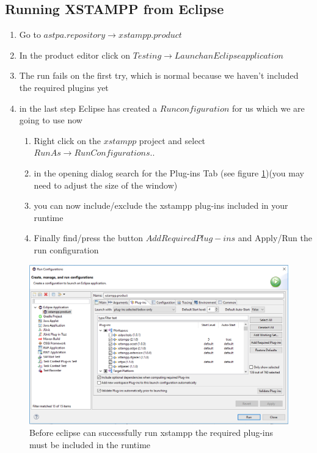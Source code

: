 \subsection{Running XSTAMPP from Eclipse}
\begin{enumerate}
\item Go to $astpa.repository\rightarrow xstampp.product$
\item In the product editor click on $ Testing\rightarrow Launch an Eclipse application$
\item The run fails on the first try, which is normal because we haven't included the required plugins yet
\item in the last step Eclipse has created a $Run configuration$ for us which we are going to use now
	\begin{enumerate}
	\item Right click on the $xstampp$ project and select $Run As\rightarrow Run Configurations..$
	\item in the opening dialog search for the Plug-ins Tab (see figure \ref{fig:runConfig})(you may need to adjust the size of the window)
	\item you can now include/exclude the xstampp plug-ins included in your runtime
	\item Finally find/press the button $Add Required Plug-ins$ and Apply/Run the run configuration
	\end{enumerate}
\end{enumerate}
\begin{figure}[H]
\includegraphics[scale=0.5]{images/runConfig.png}
\caption{Before eclipse can successfully run xstampp the required plug-ins must be included in the runtime}
\label{fig:runConfig}
\end{figure}
